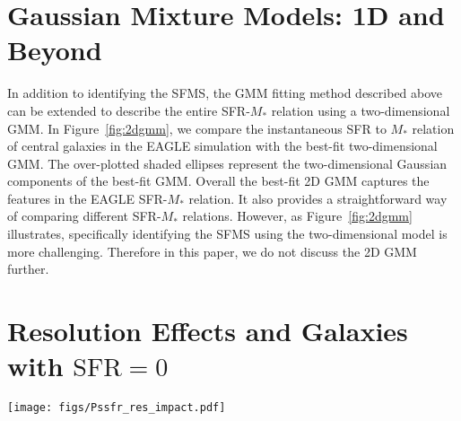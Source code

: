 \documentclass[preprint2,tighten]{aastex62}
\begin{document}
\section{Gaussian Mixture Models: 1D and Beyond}
In addition to identifying the SFMS, the GMM fitting method described above can 
be extended to describe the entire SFR-$M_*$ relation using a two-dimensional 
GMM. In Figure~\ref{fig:2dgmm}, we compare the instantaneous SFR to $M_*$ relation 
of central galaxies in the EAGLE simulation with the best-fit two-dimensional GMM. 
The over-plotted shaded ellipses represent the two-dimensional Gaussian components
of the best-fit GMM. Overall the best-fit 2D GMM captures the features in the 
EAGLE SFR-$M_*$ relation. It also provides a straightforward way of comparing 
different SFR-$M_*$ relations. However, as Figure~\ref{fig:2dgmm} illustrates, 
specifically identifying the SFMS using the two-dimensional model is more 
challenging. Therefore in this paper, we do not discuss the 2D GMM further. 


\section{Resolution Effects and Galaxies with $\mathrm{SFR} = 0$} \label{app:zerosfr}

\begin{figure*}
\begin{center}
\texttt{[image: figs/Pssfr\_res\_impact.pdf]} 
\caption{The impact of SFR resolution and galaxies with SFR$=0$, on 
the SSFR distribution, $P(\mathrm{SSFR})$, of Illustris, EAGLE, and 
MUFSAS simulations. We plot $P(\mathrm{SSFR})$ with $\mathrm{SFR} = 0$
galaxies in blue and $P(\mathrm{SSFR})$ without $\mathrm{SFR} = 0$ 
galaxies in black. The uncertainties of $P(\mathrm{SSFR})$ is obtained 
from re-sampling the SFR of each galaxy based on the SFR resolution, 
as described in  Appendix~\ref{app:zerosfr}. For each simulation, we 
present two distinct stellar mass bins to illustrate the impact at low 
and high $M_*$.
} 
\label{fig:zerosfr_res}
\end{center}
\end{figure*}
\end{document}
